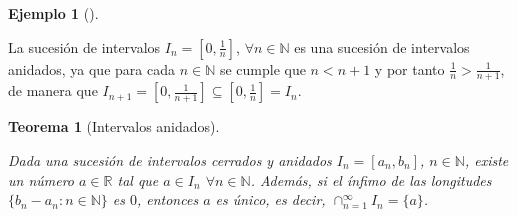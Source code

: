 \documentclass[
  a4paper,
]{scrreport}
\theoremstyle{definition}
\theoremstyle{plain}
\newtheorem{theorem}{Teorema}[chapter]
\theoremstyle{plain}
\theoremstyle{definition}
\theoremstyle{definition}
\newtheorem{example}{Ejemplo}[chapter]
\theoremstyle{plain}
\theoremstyle{remark}
\begin{document}
\begin{example}[]\protect\hypertarget{exm-sucesion-intervalos-anidados}{}\label{exm-sucesion-intervalos-anidados}

La sucesión de intervalos \(I_n=[0,\frac{1}{n}]\),
\(\forall n\in\mathbb{N}\) es una sucesión de intervalos anidados, ya
que para cada \(n\in\mathbb{N}\) se cumple que \(n<n+1\) y por tanto
\(\frac{1}{n}>\frac{1}{n+1}\), de manera que
\(I_{n+1}=[0,\frac{1}{n+1}]\subseteq [0,\frac{1}{n}]=I_n\).

\end{example}

\begin{theorem}[Intervalos
anidados]\protect\hypertarget{thm-intervalos-anidados}{}\label{thm-intervalos-anidados}

Dada una sucesión de intervalos cerrados y anidados \(I_n=[a_n,b_n]\),
\(n\in\mathbb{N}\), existe un número \(a\in\mathbb{R}\) tal que
\(a\in I_n\) \(\forall n\in\mathbb{N}\). Además, si el ínfimo de las
longitudes \(\{b_n-a_n: n\in \mathbb{N}\}\) es \(0\), entonces \(a\) es
único, es decir, \(\cap_{n=1}^\infty I_n=\{a\}\).

\end{theorem}
\end{document}
